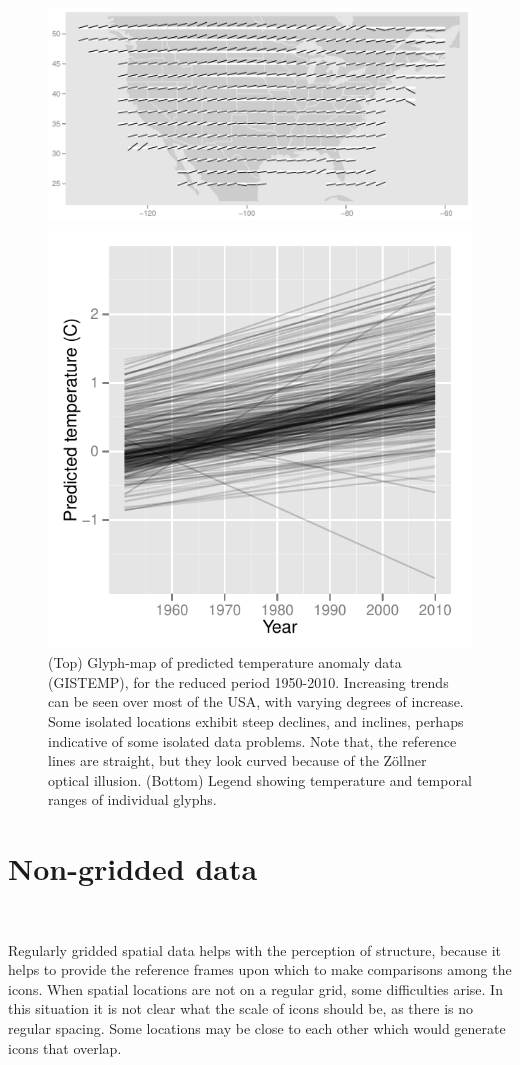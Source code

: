 \documentclass[oneside]{article}
\begin{document}
\begin{figure}[htbp]
  \centering
  \includegraphics[width=1\linewidth]{gistemp-pred}

  \includegraphics[width=0.33\linewidth]{gistemp-pred-legend}
  
  \caption{(Top) Glyph-map of predicted temperature anomaly data
    (GISTEMP), for the reduced period 1950-2010. Increasing
    trends can be seen over most of the USA, with varying degrees of
    increase. Some isolated locations exhibit steep declines, and
    inclines, perhaps indicative of some isolated data problems. Note
    that, the reference lines are straight, but they look curved
    because of the Z\"ollner optical illusion. (Bottom) Legend showing
    temperature and temporal ranges of individual glyphs.}
  \label{fig:gistemp-pred}
\end{figure}

\section{Non-gridded data}~\label{sec:irregular}

Regularly gridded spatial data helps with the perception of structure, because it helps to provide the reference frames upon which to make comparisons among the icons. When spatial locations are not on a regular grid, some difficulties arise. In this situation it is not clear what the scale of icons should be, as there is no regular spacing. Some locations may be close to each other which would generate icons that overlap. 
\end{document}
